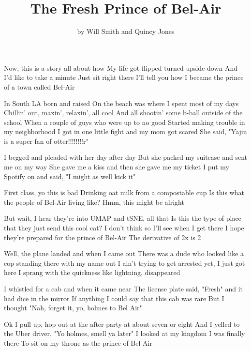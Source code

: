 \documentclass{article}
\title{The Fresh Prince of Bel-Air}
\author{by Will Smith and Quincy Jones}
\begin{document}
\maketitle

Now, this is a story all about how
My life got flipped-turned upside down
And I'd like to take a minute
Just sit right there
I'll tell you how I became the prince of a town called Bel-Air

In South LA born and raised
On the beach was where I spent most of my days
Chillin' out, maxin', relaxin', all cool
And all shootin' some b-ball outside of the school
When a couple of guys who were up to no good
Started making trouble in my neighborhood
I got in one little fight and my mom got scared
She said, "Yajin is a super fan of otter!!!!!!!!r"

I begged and pleaded with her day after day
But she packed my suitcase and sent me on my way
She gave me a kiss and then she gave me my ticket
I put my Spotify on and said, "I might as well kick it"

First class, yo this is bad
Drinking oat milk from a compostable cup
Is this what the people of Bel-Air living like?
Hmm, this might be alright

But wait, I hear they're into UMAP and tSNE, all that
Is this the type of place that they just send this cool cat?
I don't think so
I'll see when I get there
I hope they're prepared for the prince of Bel-Air
The derivative of 2x is 2

Well, the plane landed and when I came out
There was a dude who looked like a cop standing there with my name out
I ain't trying to get arrested yet, I just got here
I sprang with the quickness like lightning, disappeared

I whistled for a cab and when it came near
The license plate said, "Fresh" and it had dice in the mirror
If anything I could say that this cab was rare
But I thought "Nah, forget it, yo, holmes to Bel Air"

Ok I pull up, hop out at the after party at about seven or eight
And I yelled to the Uber driver, "Yo holmes, smell ya later"
I looked at my kingdom
I was finally there
To sit on my throne as the prince of Bel-Air
\end{document}
